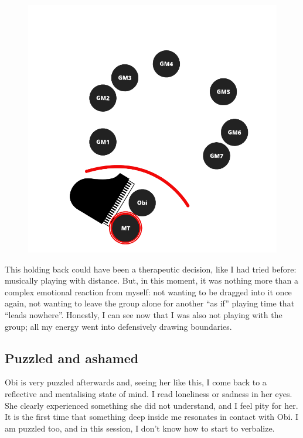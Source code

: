 \documentclass[authordate, empirical, issue]{jote-new-article}
\begin{document}
\begin{figure}


  \includegraphics[width=\linewidth]{media/image2.png}

  \caption{}

  \label{fig:rId6}


\end{figure}



This holding back could have been a therapeutic decision, like I had tried before: musically playing with distance. But, in this moment, it was nothing more than a complex emotional reaction from myself: not wanting to be dragged into it once again, not wanting to leave the group alone for another “as if” playing time that “leads nowhere”. Honestly, I can see now that I was also not playing with the group; all my energy went into defensively drawing boundaries.







\subsection{Puzzled and ashamed}



Obi is very puzzled afterwards and, seeing her like this, I come back to a reflective and mentalising state of mind. I read loneliness or sadness in her eyes. She clearly experienced something she did not understand, and I feel pity for her. It is the first time that something deep inside me resonates in contact with Obi. I am puzzled too, and in this session, I don't know how to start to verbalize.
\end{document}
